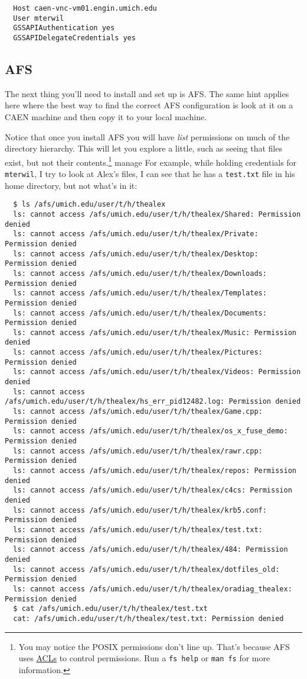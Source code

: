 \documentclass{article}
\begin{document}
\begin{lstlisting}
  Host caen-vnc-vm01.engin.umich.edu
  User mterwil
  GSSAPIAuthentication yes
  GSSAPIDelegateCredentials yes
\end{lstlisting}

\subsection*{AFS}

The next thing you'll need to install and set up is AFS. The same hint applies
here where the best way to find the correct AFS configuration is look at it on
a CAEN machine and then copy it to your local machine.

Notice that once you install AFS you will have \emph{list} permissions on much
of the directory hierarchy. This will let you explore a little, such as seeing
that files exist, but not their contents.\footnote{You may notice the POSIX
permissions don't line up. That's because AFS uses
\href{https://web.njit.edu/info/afs.perms.html}{ACLs} to control permissions.
Run a \texttt{fs help} or \texttt{man fs} for more information. }
manage  For example, while holding credentials for \texttt{mterwil}, I try to
look at Alex's files, I can see that he has a \texttt{test.txt} file in his home
directory, but not what's in it:

\begin{lstlisting}
  $ ls /afs/umich.edu/user/t/h/thealex
  ls: cannot access /afs/umich.edu/user/t/h/thealex/Shared: Permission denied
  ls: cannot access /afs/umich.edu/user/t/h/thealex/Private: Permission denied
  ls: cannot access /afs/umich.edu/user/t/h/thealex/Desktop: Permission denied
  ls: cannot access /afs/umich.edu/user/t/h/thealex/Downloads: Permission denied
  ls: cannot access /afs/umich.edu/user/t/h/thealex/Templates: Permission denied
  ls: cannot access /afs/umich.edu/user/t/h/thealex/Documents: Permission denied
  ls: cannot access /afs/umich.edu/user/t/h/thealex/Music: Permission denied
  ls: cannot access /afs/umich.edu/user/t/h/thealex/Pictures: Permission denied
  ls: cannot access /afs/umich.edu/user/t/h/thealex/Videos: Permission denied
  ls: cannot access /afs/umich.edu/user/t/h/thealex/hs_err_pid12482.log: Permission denied
  ls: cannot access /afs/umich.edu/user/t/h/thealex/Game.cpp: Permission denied
  ls: cannot access /afs/umich.edu/user/t/h/thealex/os_x_fuse_demo: Permission denied
  ls: cannot access /afs/umich.edu/user/t/h/thealex/rawr.cpp: Permission denied
  ls: cannot access /afs/umich.edu/user/t/h/thealex/repos: Permission denied
  ls: cannot access /afs/umich.edu/user/t/h/thealex/c4cs: Permission denied
  ls: cannot access /afs/umich.edu/user/t/h/thealex/krb5.conf: Permission denied
  ls: cannot access /afs/umich.edu/user/t/h/thealex/test.txt: Permission denied
  ls: cannot access /afs/umich.edu/user/t/h/thealex/484: Permission denied
  ls: cannot access /afs/umich.edu/user/t/h/thealex/dotfiles_old: Permission denied
  ls: cannot access /afs/umich.edu/user/t/h/thealex/oradiag_thealex: Permission denied
  $ cat /afs/umich.edu/user/t/h/thealex/test.txt
  cat: /afs/umich.edu/user/t/h/thealex/test.txt: Permission denied
\end{lstlisting}
\end{document}
